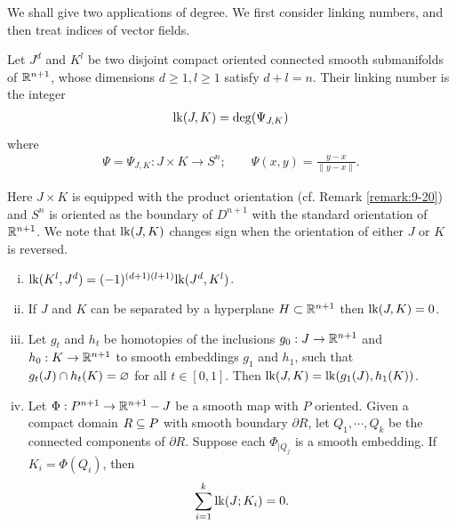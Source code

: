 We shall give two applications of degree. We first consider linking numbers, and
then treat indices of vector fields.

\begin{definition}\label{def:11-12}
  Let $J^d$ and $K^l$ be two disjoint compact oriented connected smooth submanifolds of $\mathbb{R}^{n +1}$, 
  whose dimensions $d\ge 1, l\ge 1$ satisfy $d + l = n$. Their linking number is the integer
  \begin{align*}
    \mathrm{lk}(J, K) = \mathrm{deg}(\Psi_{J, K})
  \end{align*}
  where 
  \begin{align*}
    \Psi = \Psi_{J, K}:J\times K\to S^{n};\qquad \Psi(x, y) = \frac{y-x}{\|y-x\|}.
  \end{align*}
\end{definition}

Here $J\times K$ is equipped with the product orientation (cf. Remark \ref{remark:9-20}) and $S^n$ 
is oriented as the boundary of $D^{n+1}$ with the standard orientation of $\mathbb{R}^{n+1}$. We note
that $\mathrm{lk}(J, K)$ changes sign when the orientation of either $J$ or $K$ is reversed.

\begin{proposition}\label{prop:11-13}\;\par 
  \begin{enumerate}[(i)]
    \item $\mathrm{lk}(K^l, J^d) = (-1)^{(d+1)(l+1)}\mathrm{lk}(J^d, K^l)$.
    \item If $J$ and $K$ can be separated by a hyperplane $H\subset\mathbb{R}^{n+1}$ then $\mathrm{lk}(J, K) = 0$.
    \item Let $g_t$ and $h_t$ be homotopies of the inclusions $g_0:J\to\mathbb{R}^{n+1}$ and $h_0:K\to\mathbb{R}^{n+1}$
      to smooth embeddings $g_1$ and $h_1$, such that $g_t(J)\cap h_t(K) = \varnothing$ for all $t\in[0, 1]$. Then 
      $\mathrm{lk}(J, K) = \mathrm{lk}(g_1(J), h_1(K))$.
    \item Let $\Phi:P^{n+1}\to\mathbb{R}^{n+1}-J$ be a smooth map with $P$ oriented. Given a compact domain 
      $R\subseteq P$ with smooth boundary $\partial R$, let $Q_1, \cdots, Q_k$ be the connected components 
      of $\partial R$. Suppose each $\Phi_{|Q_j}$ is a smooth embedding. If $K_i = \Phi(Q_i)$, then 
      \begin{align*}
        \sum_{i=1 }^{k }{\mathrm{lk}(J; K_i)} = 0.
      \end{align*}
  \end{enumerate}
\end{proposition}

